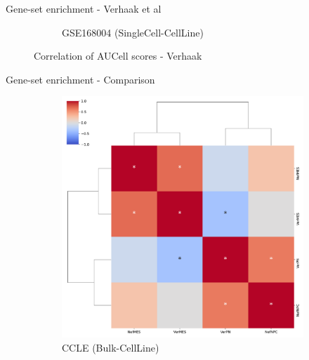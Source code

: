 \documentclass[aspectratio=169,9pt]{beamer}
\begin{document}
\begin{frame}{Gene-set enrichment - Verhaak et al}
\begin{adjustwidth}{-5cm}{-5cm}
\begin{figure}
\begin{subfigure}[c]{0.48\textwidth}
                    \caption{GSE168004 (SingleCell-CellLine)}
                \end{subfigure}
                \caption{Correlation of AUCell scores - Verhaak}
            \end{figure}
        \end{adjustwidth}
    \end{frame}

    \begin{frame}{Gene-set enrichment - Comparison}
        \begin{adjustwidth}{-5cm}{-5cm}
            \centering
            \begin{figure}\ContinuedFloat
                \centering
                \begin{subfigure}[c]{0.48\textwidth}
                    \centering
                    \includegraphics[width=\textwidth]{ssGSEA_CCLE_corrplot_2D}
                    \caption{CCLE (Bulk-CellLine)}
                \end{subfigure}
                \begin{subfigure}[c]{0.48\textwidth}
                    \centering

\end{subfigure}
\end{figure}
\end{adjustwidth}
\end{frame}
\end{document}

